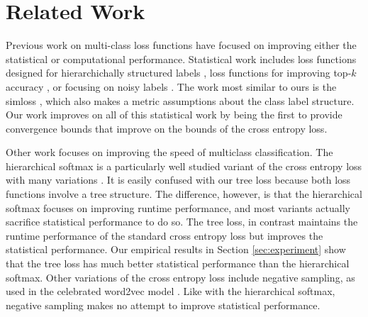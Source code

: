 \documentclass[twoside]{article}
\begin{document}
\section{Related Work}
\label{sec:related}

Previous work on multi-class loss functions have focused on improving either the statistical or computational performance.
Statistical work includes loss functions designed for hierarchichally structured labels \citep{cesa2006incremental,wu2017hierarchical},
loss functions for improving top-$k$ accuracy \citep{lapin2016loss},
or focusing on noisy labels \citep{sukhbaatar2014training,zhang2018generalized}.
The work most similar to ours is the simloss \citep{Kobs2020SimLossCS},
which also makes a metric assumptions about the class label structure.
Our work improves on all of this statistical work by being the first to provide convergence bounds that improve on the bounds of the cross entropy loss.

Other work focuses on improving the speed of multiclass classification.
The hierarchical softmax \citep{morin2005hierarchical} is a particularly well studied variant of the cross entropy loss with many variations \citep[e.g.][]{Peng2017IncrementallyLT,Jiang2017ExplorationOT,Yang2017OptimizeHS,Mohammed2018EffectivenessOH}.
It is easily confused with our tree loss because both loss functions involve a tree structure.
The difference, however, is that the hierarchical softmax focuses on improving runtime performance,
and most variants actually sacrifice statistical performance to do so.
The tree loss, in contrast maintains the runtime performance of the standard cross entropy loss but improves the statistical performance.
Our empirical results in Section \ref{sec:experiment} show that the tree loss has much better statistical performance than the hierarchical softmax.
Other variations of the cross entropy loss include negative sampling, as used in the celebrated word2vec model \citep{mikolov2013distributed}. 
Like with the hierarchical softmax, negative sampling makes no attempt to improve statistical performance.
\end{document}
